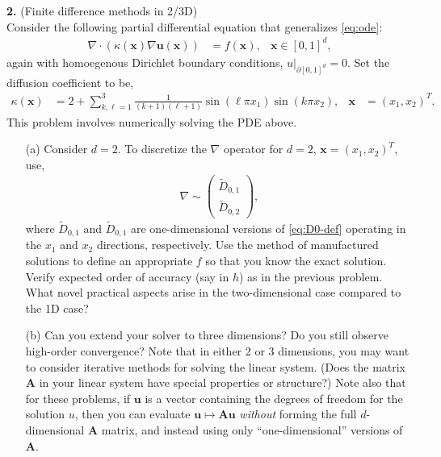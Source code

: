 \documentclass[11pt]{amsart}
\newcommand{\bs}[1]{\boldsymbol{#1}}
\begin{document}
\noindent\textbf{2.} (Finite difference methods in 2/3D)\\
  Consider the following partial differential equation that generalizes \eqref{eq:ode}:
  \begin{align}\label{eq:laplace}
    \nabla \cdot \left(\kappa(\bs{x}) \nabla \bs{u}(\bs{x}) \right) &= f(\bs{x}), & \bs{x} \in [0,1]^d,
  \end{align}
  again with homoegenous Dirichlet boundary conditions, $u\big|_{\partial [0,1]^d} = 0$. Set the diffusion coefficient to be,
  \begin{align*}
    \kappa(\bs{x}) &= 2 + \sum_{k,\ell = 1}^3 \frac{1}{(k+1)(\ell+1)} \sin(\ell \pi x_1) \sin (k \pi x_2), & \bs{x} &= (x_1, x_2)^T.
  \end{align*}
  This problem involves numerically solving the PDE above.
  \begin{itemize}
    \item[(a)] Consider $d = 2$. To discretize the $\nabla$ operator for $d=2$, $\bs{x} = (x_1, x_2)^T$, use,
    \begin{align*}
      \nabla \sim \left(\begin{array}{c} \widetilde{D}_{0,1} \\ \widetilde{D}_{0,2} \end{array}\right),
    \end{align*}
      where $\widetilde{D}_{0,1}$ and $\widetilde{D}_{0,1}$ are one-dimensional versions of \eqref{eq:D0-def} operating in the $x_1$ and $x_2$ directions, respectively. Use the method of manufactured solutions to define an appropriate $f$ so that you know the exact solution. Verify expected order of accuracy (say in $h$) as in the previous problem. What novel practical aspects arise in the two-dimensional case compared to the 1D case?
    \item[(b)] Can you extend your solver to three dimensions? Do you still observe high-order convergence?  Note that in either 2 or 3 dimensions, you may want to consider iterative methods for solving the linear system. (Does the matrix $\bs{A}$ in your linear system have special properties or structure?) Note also that for these problems, if $\bs{u}$ is a vector containing the degrees of freedom for the solution $u$, then you can evaluate $\bs{u} \mapsto \bs{A} \bs{u}$ \textit{without} forming the full $d$-dimensional $\bs{A}$ matrix, and instead using only ``one-dimensional'' versions of $\bs{A}$.
  \end{itemize}
\end{document}

